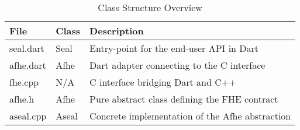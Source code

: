 \begin{table}[h!]
\centering
\begin{tabular}{|l|l|p{9cm}|}
\hline
\textbf{File} & \textbf{Class} & \textbf{Description} \\ \hline
seal.dart    & Seal    & Entry-point for the end-user API in Dart \\ \hline
afhe.dart    & Afhe    & Dart adapter connecting to the C interface \\ \hline
fhe.cpp      & N/A     & C interface bridging Dart and C++ \\ \hline
afhe.h       & Afhe    & Pure abstract class defining the FHE contract \\ \hline
aseal.cpp    & Aseal   & Concrete implementation of the Afhe abstraction \\ \hline
\end{tabular}
\caption{Class Structure Overview}
\label{table:class-structure}
\end{table}
